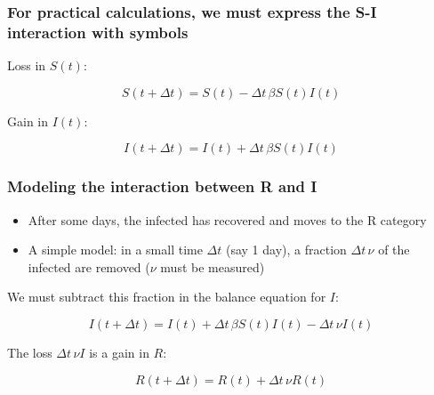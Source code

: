 \documentclass{beamer}
\newenvironment{block_mdfboxadmon}[1][]{\begin{block}{#1}}{\end{block}}
\begin{document}
\begin{frame}
\frametitle{For practical calculations, we must express the S-I interaction with symbols}

Loss in $S(t)$:

\[ S(t+\Delta t) = S(t) - \Delta t\,\beta S(t)I(t)\]

Gain in $I(t)$:

\[ I(t+\Delta t) = I(t) + \Delta t\,\beta S(t)I(t)\]
\end{frame}

\begin{frame}
\frametitle{Modeling the interaction between R and I}

\begin{block_mdfboxadmon}[R-I interaction:]
\begin{itemize}
 \item After some days, the infected has recovered and moves to the R category

 \item A simple model: in a small time $\Delta t$ (say 1 day),
   a fraction $\Delta t\,\nu$ of the infected are removed
   ($\nu$ must be measured)
\end{itemize}

\noindent
\end{block_mdfboxadmon}



We must subtract this fraction in the balance equation for $I$:

\[ I(t+\Delta t) = I(t) + \Delta t\,\beta S(t)I(t) -\Delta t\,\nu I(t) \]

The loss $\Delta t\,\nu I$ is a gain in $R$:

\[ R(t+\Delta t) = R(t) + \Delta t\,\nu R(t)\]
\end{frame}
\end{document}
